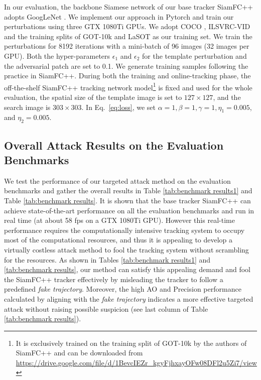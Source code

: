 \documentclass[journal]{IEEEtran}
\begin{document}
In our evaluation, the backbone Siamese network of our base tracker SiamFC++ \cite{SiamFC++} adopts GoogLeNet \cite{GoogLeNet}.
We implement our approach in Pytorch and train our perturbations using three GTX 1080Ti GPUs.
We adopt COCO \cite{COCO}, ILSVRC-VID \cite{VID} and the training splits of GOT-10k \cite{GOT-10k} and LaSOT \cite{LaSOT} as our training set.
We train the perturbations for 8192 iterations with a mini-batch of 96 images (32 images per GPU).
Both the hyper-parameters $\epsilon_1$ and $\epsilon_2$ for the template perturbation and the adversarial patch are set to 0.1.
We generate training samples following the practice in SiamFC++.
During both the training and online-tracking phase, the off-the-shelf SiamFC++ tracking network model\footnote{It is exclusively trained on the training split of GOT-10k by the authors of SiamFC++ and can be downloaded from \url{https://drive.google.com/file/d/1BevcIEZr_kgyFjhxayOFw08DFl2u5Zi7/view}} is fixed and used for the whole evaluation, the spatial size of the template image is set to $127\times 127$, and the search image is $303\times 303$.
In Eq.~\eqref{eq:loss}, we set $\alpha=1, \beta=1, \gamma=1, \eta_1=0.005$, and $\eta_2=0.005$.
\vspace{-3mm}

\subsection{Overall Attack Results on the Evaluation Benchmarks}

We test the performance of our targeted attack method on the evaluation benchmarks and gather the overall results in Table \ref{tab:benchmark results1} and Table \ref{tab:benchmark results}. It is shown that the base tracker SiamFC++ can achieve state-of-the-art performance on all the evaluation benchmarks and run in real time (at about 58 fps on a GTX 1080Ti GPU). However this real-time performance requires the computationally intensive tracking system to occupy most of the computational resources, and thus it is appealing to develop a virtually costless attack method to fool the tracking system without scrambling for the resources. As shown in Tables \ref{tab:benchmark results1} and \ref{tab:benchmark results}, our method can satisfy this appealing demand and fool the SiamFC++ tracker effectively by misleading the tracker to follow a predefined \textit{fake trajectory}. Moreover, the high AO and Precision performance calculated by aligning with the \textit{fake trajectory} indicates a more effective targeted attack without raising possible suspicion (see last column of Table \ref{tab:benchmark results}).
\vspace{-3mm}
\end{document}
